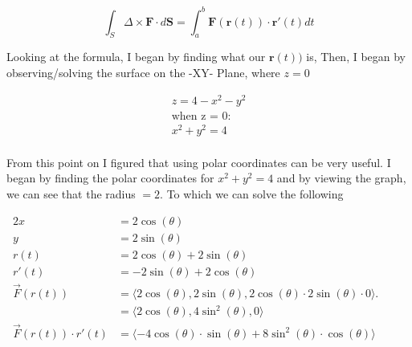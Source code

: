\documentclass[a4paper]{article}
\begin{document}
\begin{equation}
    \int_S \Delta \times \mathbf{F} \cdot d\mathbf{S} = \int_a^b \mathbf{F}(\mathbf{r}(t)) \cdot \mathbf{r}'(t) dt
\end{equation}

Looking at the formula, I began by finding what our $\mathbf{r}(t))$ is, Then, I began by observing/solving the surface on the -XY- Plane, where $z = 0$


\begin{align*}
z = 4 - x^2 - y^2 \\
\text{when z = 0: } \\
x^2 + y^2 = 4 \\
\end{align*}

\begin{center}
\end{center}

From this point on I figured that using polar coordinates can be very useful. I began by finding the polar coordinates for $x^2 + y^2 = 4$
and by viewing the graph, we can see that the radius $= 2$. To which we can solve the following

\begin{alignat}{2}
    x &= 2\cos(\theta) \quad && \\
    y &= 2\sin(\theta) \quad && \\
    r(t) &= 2\cos(\theta) + 2\sin(\theta) \quad && \\
    r'(t) &= -2\sin(\theta) + 2\cos(\theta) \quad && \\
    \vec{F}(r(t)) &= \langle 2\cos(\theta), 2\sin(\theta), 2\cos(\theta) \cdot 2\sin(\theta) \cdot 0 \rangle. \\
    &= \langle 2\cos(\theta), 4\sin^2(\theta), 0 \rangle \quad && \\
    \vec{F}(r(t)) \cdot r'(t) &= \langle -4\cos(\theta) \cdot \sin(\theta) + 8\sin^2(\theta) \cdot \cos(\theta) \rangle \quad &&
\end{alignat}
\end{document}
